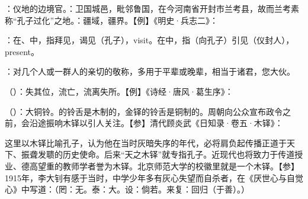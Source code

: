 {
\item {}：仪地的边境官。：卫国城邑，毗邻鲁国，在今河南省开封市兰考县，故而兰考素称“孔子过化”之地。：疆域，疆界。【例】《明史·兵志二》：
\item {}：在、中，指拜见，谒见（孔子），visit。在中，指（向孔子）引见（仪封人），present。
\item {}：对几个人或一群人的亲切的敬称，多用于平辈或晚辈，相当于诸君，您大伙。
\item {}（）：失其位，流亡，流离失所。【例】《诗经·唐风·葛生序》：
\item {}（）：大铜铃。的铃舌是木制的，金铎的铃舌是铜制的。周朝向公众宣布政令之前，会沿途振响木铎以引人关注。【参】清代顾炎武《日知录·卷五·木铎》：

这里以木铎比喻孔子，认为他在当时灰暗失序的年代，必将肩负起传播正道于天下、振聋发聩的历史使命。后来“天之木铎”就专指孔子。近现代也将致力于传道授业、德高望重的教师学者誉为木铎。北京师范大学的校徽里就是一个木铎。【参】1915年，李大钊有感于当时，中学少年多有灰心失望而自杀者，在《厌世心与自觉心》中写道：（罔：无。泰：大。设：倘若。来复：回归（于善）。）
}
{}


